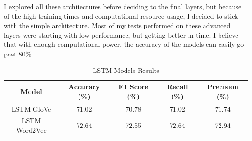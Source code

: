 I explored all these architectures before deciding to the final layers, but because of the high training times and computational resource usage, I decided to stick with the simple architecture. 
Most of my tests performed on these advanced layers were starting with low performance, but getting better in time. I believe that with enough computational power, the accuracy of the models can 
easily go past 80\%.

\begin{table}
    \caption{LSTM Models Results}
    \label{Table_2}
    \begin{tabular}{ccccc}
        \toprule
            \textbf{Model} & \textbf{Accuracy (\%)} & \textbf{F1 Score (\%)} & \textbf{Recall (\%)} & \textbf{Precision (\%)} \\
        \midrule
            LSTM GloVe     & 71.02 & 70.78 & 71.02 & 71.74 \\
            LSTM Word2Vec  & 72.64 & 72.55 & 72.64 & 72.94 \\
        \bottomrule
    \end{tabular}
\end{table}